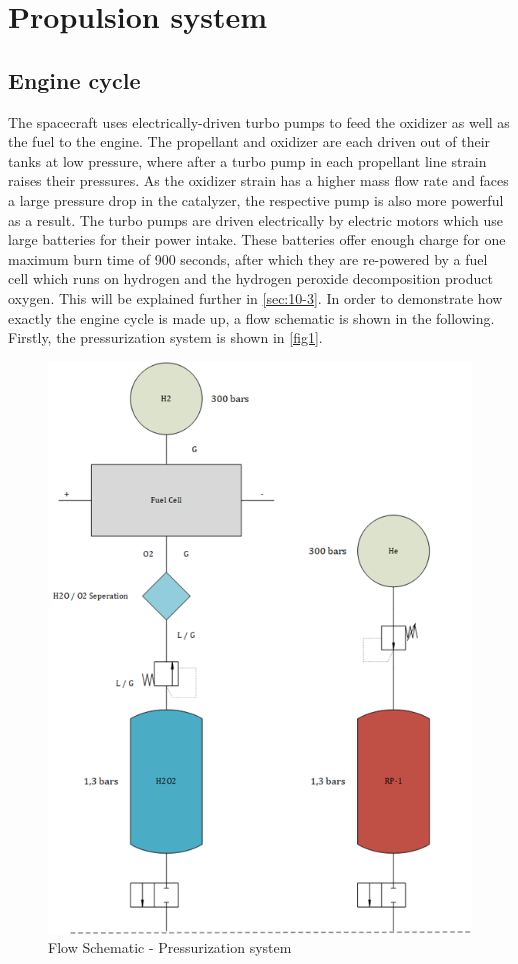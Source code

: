 \chapter{Propulsion system}
\label{chap:10}
\section{Engine cycle}
\qquad The spacecraft uses electrically-driven turbo pumps to feed the oxidizer as well as the fuel to the engine. The propellant and oxidizer are each driven out of their tanks at low pressure, where after a turbo pump in each propellant line strain raises their pressures. As the oxidizer strain has a higher mass flow rate and faces a large pressure drop in the catalyzer, the respective pump is also more powerful as a result. The turbo pumps are driven electrically by electric motors which use large batteries for their power intake. These batteries offer enough charge for one maximum burn time of 900 seconds, after which they are re-powered by a fuel cell which runs on hydrogen and the hydrogen peroxide decomposition product oxygen. This will be explained further in \autoref{sec:10-3}. In order to demonstrate how exactly the engine cycle is made up, a flow schematic is shown in the following. Firstly, the pressurization system is shown in \autoref{fig1}.
\begin{figure}[H]
	\centering\includegraphics[width=0.5\linewidth]{pressurizationsystem}
	\caption{Flow Schematic - Pressurization system}\label{fig1}
\end{figure}

